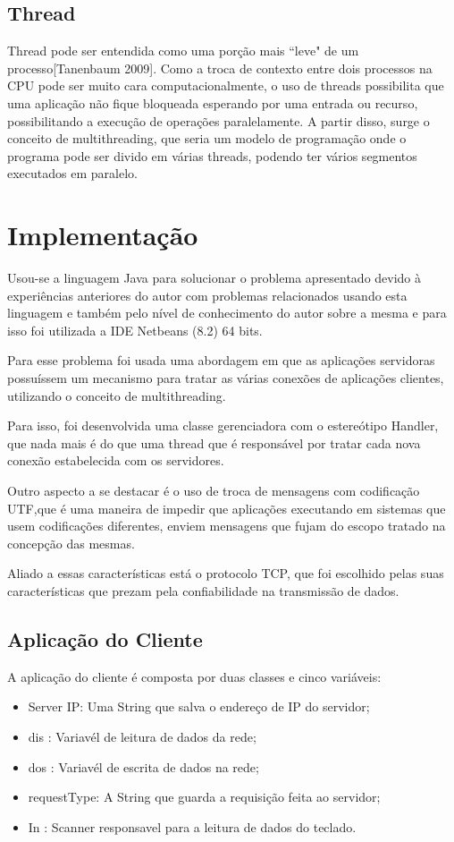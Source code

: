 \documentclass[brazil, a4paper,12pt]{article}
\begin{document}
\subsection{Thread}
Thread      pode      ser      entendida      como      uma      porção      mais      “leve" de      um processo[Tanenbaum 2009].      Como   a   troca   de   contexto   entre   dois   processos   na CPU  pode  ser  muito  cara  computacionalmente,  o  uso  de  threads  possibilita  que  uma aplicação não fique bloqueada esperando por uma entrada ou recurso,  possibilitando a execução de operações paralelamente.
A partir disso, surge o conceito de multithreading, que seria um modelo de programação onde o programa pode ser divido em várias threads, podendo ter vários segmentos executados em paralelo.

\section{Implementação}

Usou-se a linguagem Java para solucionar o problema apresentado devido à experiências anteriores do autor com problemas relacionados usando esta linguagem e também pelo nível de conhecimento do autor sobre a mesma e para isso foi utilizada a IDE Netbeans (8.2) 64 bits.

Para esse problema foi usada uma abordagem em que as aplicações servidoras possuíssem um mecanismo para tratar as várias conexões de aplicações clientes, utilizando o conceito de multithreading.

Para isso, foi desenvolvida uma classe gerenciadora com o estereótipo Handler, que nada mais é do que uma thread que é responsável por tratar cada nova conexão estabelecida com os servidores.

Outro aspecto a se destacar é o uso de troca de mensagens com codificação UTF,que é uma maneira de impedir que aplicações executando em sistemas que usem codificações diferentes,  enviem mensagens que fujam do escopo tratado na concepção das mesmas.

Aliado a essas características está o protocolo TCP, que foi escolhido pelas suas características que prezam pela confiabilidade na transmissão de dados.

\subsection{Aplicação do Cliente}

A aplicação do cliente é composta por duas classes e cinco variáveis:
\begin{itemize}
\item Server IP: Uma String que salva o endereço de IP do servidor;
\item dis : Variavél de leitura de dados da rede;
\item dos : Variavél de escrita de dados na rede;
\item requestType: A String que guarda a requisição feita ao servidor;
\item In : Scanner responsavel para a leitura de dados do teclado.
\end{itemize}
\end{document}
